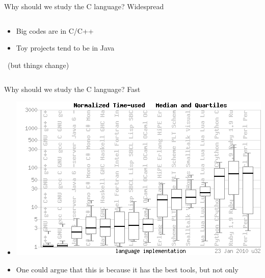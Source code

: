 \begin{frame}{Why should we study the C language? Widespread}
\begin{columns}
\begin{column}{.5\linewidth}
        \begin{itemize}
        \item Big codes are in C/C++ 
        \item Toy projects tend to be in Java
        \end{itemize}
        ~(but things change)
      \end{column}
    \end{columns}
\end{frame}
\begin{frame}{Why should we study the C language? Fast}
  \begin{itemize}
  \item {}
    \includegraphics[width=.9\linewidth]{img/intro-shootout-fast.png}

  \item One could argue that this is because it has the best tools, but not
    only 
  \end{itemize}
\end{frame}
